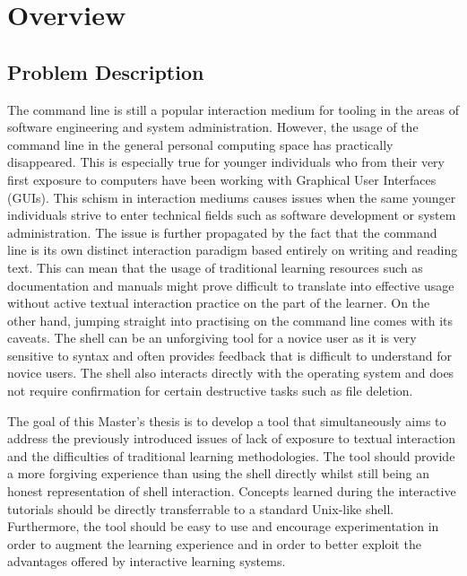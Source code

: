 \chapter{Overview}
\label{chap:overview}
\section{Problem Description}

The command line is still a popular interaction medium for tooling in the areas
of software engineering and system administration. However, the usage of the
command line in the general personal computing space has practically
disappeared. This is especially true for younger individuals who from their
very first exposure to computers have been working with Graphical User
Interfaces (GUIs). This schism in interaction mediums causes issues when the
same younger individuals strive to enter technical fields such as software
development or system administration. The issue is further propagated by the
fact that the command line is its own distinct interaction paradigm
based entirely on writing and reading text. This can mean that the usage of
traditional learning resources such as documentation and manuals might prove
difficult to translate into effective usage without active textual interaction
practice on the part of the learner. On the other hand, jumping straight into
practising on the command line comes with its caveats. The shell can be an
unforgiving tool for a novice user as it is very sensitive to syntax and often
provides feedback that is difficult to understand for novice users. The shell
also interacts directly with the operating system and does not require
confirmation for certain destructive tasks such as file deletion.

The goal of this Master's thesis is to develop a tool that simultaneously aims
to address the previously introduced issues of lack of exposure to textual
interaction and the difficulties of traditional learning methodologies. The
tool should provide a more forgiving experience than using the shell directly
whilst still being an honest representation of shell interaction. Concepts
learned during the interactive tutorials should be directly transferrable to a
standard Unix-like shell. Furthermore, the tool should be easy to use and
encourage experimentation in order to augment the learning experience and in
order to better exploit the advantages offered by interactive learning systems.


